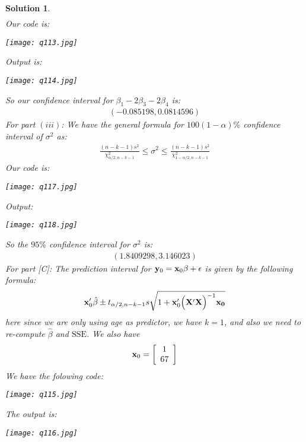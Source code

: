 \documentclass[11pt]{article}
\newtheorem{sol}{Solution}
\begin{document}
\begin{sol}
\begin{align*}
	\end{align*}
	Our code is:
	\begin{center}
		\texttt{[image: q113.jpg]}
	\end{center}
	Output is:
	\begin{center}
		\texttt{[image: q114.jpg]}
	\end{center}
	So our confidence interval for $\beta_1 - 2\beta_3-2\beta_4$ is:
	\begin{align*}
		(-0.085198, 0.0814596)
	\end{align*}
	For part $(iii)$:\vskip 2mm
	We have the general formula for $100(1 - \alpha)\%$ confidence interval of $\sigma^2$ as:
	\begin{align*}
		\frac{(n - k - 1)s^2}{\chi^2_{\alpha/2, n - k - 1}} \leq \sigma^2 \leq \frac{(n - k - 1)s^2}{\chi^2_{1 - \alpha/2, n - k - 1}}
	\end{align*}
	Our code is:
	\begin{center}
		\texttt{[image: q117.jpg]}
	\end{center}
	Output:
	\begin{center}
		\texttt{[image: q118.jpg]}
	\end{center}
	So the $95\%$ confidence interval for $\sigma^2$ is:
	\begin{align*}
		(1.8409298, 3.146023)
	\end{align*}
	\vskip 2mm
	For part [C]:\vskip 2mm
	The prediction interval for ${\bf y}_0 = {\bf x}_0\beta + \epsilon$ is given by the following formula:
	\begin{align*}
		{\bf x}_0'\hat{\beta} \pm t_{\alpha/2, n - k - 1}s\sqrt{1 + {\bf x}_0'\Big({\bf X}'{\bf X}\Big)^{-1}{\bf x_0}}
	\end{align*}
	here since we are only using age as predictor, we have $k = 1$, and also we need to re-compute $\hat{\beta}$ and $\text{SSE}$.\vskip 2mm
	We also have
	\begin{align*}
		{\bf x}_0 = \left[\begin{array}{c}1 \\ 67\end{array}\right]
	\end{align*}
	We have the folowing code:
	\begin{center}
		\texttt{[image: q115.jpg]}
	\end{center}
	The output is:
	\begin{center}
		\texttt{[image: q116.jpg]}
	\end{center}

\end{sol}
\end{document}
